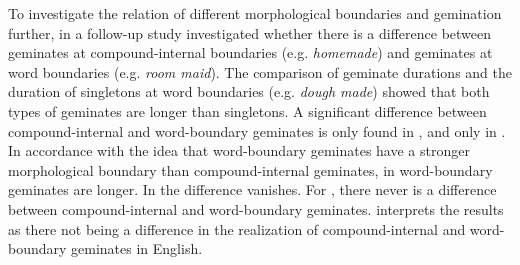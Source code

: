 To investigate the relation of different morphological boundaries and gemination further, in a follow-up study \cite{Oh.2013} investigated whether there is a difference between geminates at compound-internal boundaries (e.g. \textit{homemade}) and geminates at word boundaries (e.g. \textit{room maid}). The comparison of geminate durations and the duration of singletons at word boundaries (e.g. \textit{dough made}) showed that both types of geminates are longer than singletons. A significant difference between compound-internal and word-boundary geminates is only found in , and only in . In accordance with the idea that word-boundary geminates have a stronger morphological boundary than compound-internal geminates,  in  word-boundary geminates are longer. In  the difference vanishes. For , there never is a difference between compound-internal and word-boundary geminates. \cite{Oh.2013} interprets the results as there not being a difference in the realization of compound-internal and word-boundary geminates in English. 


